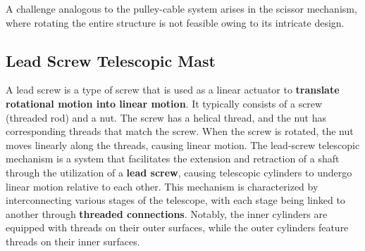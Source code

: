 \documentclass[a4,10pt]{report}
\begin{document}
A challenge analogous to the pulley-cable system arises in the scissor mechanism, where rotating the entire structure is not feasible owing to its intricate design.

\subsection{Lead Screw Telescopic Mast}
A lead screw is a type of screw that is used as a linear actuator to \textbf{translate rotational motion into linear motion}. It typically consists of a screw (threaded rod) and a nut. The screw has a helical thread, and the nut has corresponding threads that match the screw. When the screw is rotated, the nut moves linearly along the threads, causing linear motion. The lead-screw telescopic mechanism is a system that facilitates the extension and retraction of a shaft through the utilization of a \textbf{lead screw}, causing telescopic cylinders to undergo linear motion relative to each other. This mechanism is characterized by interconnecting various stages of the telescope, with each stage being linked to another through \textbf{threaded connections}. Notably, the inner cylinders are equipped with threads on their outer surfaces, while the outer cylinders feature threads on their inner surfaces.\cite{lead_screw}
\vspace{2mm} \\
\end{document}
